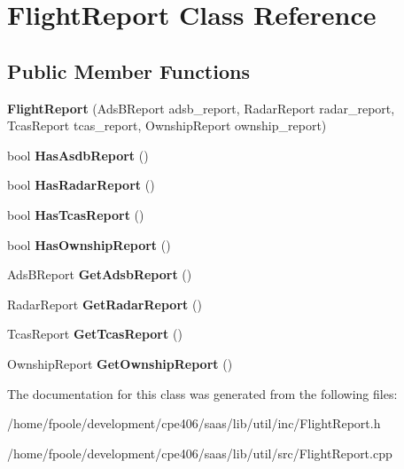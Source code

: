 \hypertarget{class_flight_report}{}\section{Flight\+Report Class Reference}
\label{class_flight_report}
\subsection*{Public Member Functions}
\begin{DoxyCompactItemize}
\item 
\hypertarget{class_flight_report_a71d495ac870fd881e32bad5c210ac680}{}{\bfseries Flight\+Report} (Ads\+B\+Report adsb\+\_\+report, Radar\+Report radar\+\_\+report, Tcas\+Report tcas\+\_\+report, Ownship\+Report ownship\+\_\+report)\label{class_flight_report_a71d495ac870fd881e32bad5c210ac680}

\item 
\hypertarget{class_flight_report_a86a3485e1d03c8f11a6ed017d5c89d80}{}bool {\bfseries Has\+Asdb\+Report} ()\label{class_flight_report_a86a3485e1d03c8f11a6ed017d5c89d80}

\item 
\hypertarget{class_flight_report_a0c8fc27969f6a065cf968f7a7c7df8ab}{}bool {\bfseries Has\+Radar\+Report} ()\label{class_flight_report_a0c8fc27969f6a065cf968f7a7c7df8ab}

\item 
\hypertarget{class_flight_report_ade5d95ae22a0808f9d04cb3765c38294}{}bool {\bfseries Has\+Tcas\+Report} ()\label{class_flight_report_ade5d95ae22a0808f9d04cb3765c38294}

\item 
\hypertarget{class_flight_report_af6ddf223c5fa9caf071418e8e62ba768}{}bool {\bfseries Has\+Ownship\+Report} ()\label{class_flight_report_af6ddf223c5fa9caf071418e8e62ba768}

\item 
\hypertarget{class_flight_report_ae44b2960541576633260bdf7a76d3d13}{}Ads\+B\+Report {\bfseries Get\+Adsb\+Report} ()\label{class_flight_report_ae44b2960541576633260bdf7a76d3d13}

\item 
\hypertarget{class_flight_report_a9bd8c216d732f19dca756584264a8c15}{}Radar\+Report {\bfseries Get\+Radar\+Report} ()\label{class_flight_report_a9bd8c216d732f19dca756584264a8c15}

\item 
\hypertarget{class_flight_report_a7694aa739f64278a529110e010eb0612}{}Tcas\+Report {\bfseries Get\+Tcas\+Report} ()\label{class_flight_report_a7694aa739f64278a529110e010eb0612}

\item 
\hypertarget{class_flight_report_a8da40bbb64d3a99d26f24831cbe528d0}{}Ownship\+Report {\bfseries Get\+Ownship\+Report} ()\label{class_flight_report_a8da40bbb64d3a99d26f24831cbe528d0}

\end{DoxyCompactItemize}


The documentation for this class was generated from the following files\+:\begin{DoxyCompactItemize}
\item 
/home/fpoole/development/cpe406/saas/lib/util/inc/Flight\+Report.\+h\item 
/home/fpoole/development/cpe406/saas/lib/util/src/Flight\+Report.\+cpp\end{DoxyCompactItemize}
